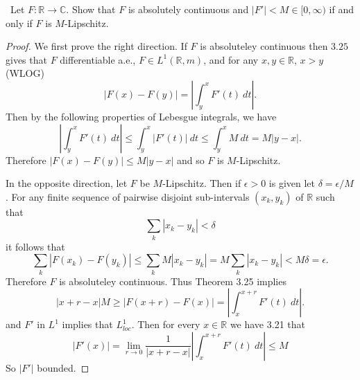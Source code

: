 \documentclass[11pt]{amsart}
\theoremstyle{definition}
\numberwithin{theorem}{section}
\numberwithin{definition}{section}
\numberwithin{equation}{section}
\begin{document}
  \medskip {}\ Let $F: \mathbb{R} \to \mathbb{C}$. Show that $F$ is absolutely continuous and $|F'| < M \in [0, \infty)$
  if and only if $F$ is $M$-Lipschitz.
  \begin{proof}
  	We first prove the right direction. If $F$ is absoluteley continuous then $3.25$ gives  that $F$ differentiable a.e., $F \in L^1(\mathbb{R}, m)$, and for any $x,y \in \mathbb{R}$, $x >y$ (WLOG)
  	\begin{equation*}
  		|F(x) - F(y)| = \left|\int_y^x F'(t)\ dt\right|.
  	\end{equation*}
  	Then  by the following properties of Lebesgue integrals, we have
  	\begin{equation*}
  		\left|\int_y^x F'(t)\ dt\right| \leq \int_y^x |F'(t)|\ dt \leq \int_y^x M\ dt = M|y-x|
  		.
  	\end{equation*}
  	Therefore $|F(x) - F(y)|  \leq M|y-x|$ and so $F$ is $M$-Lipschitz.

  	In the opposite direction, let $F$ be $M$-Lipschitz. Then if $\epsilon > 0$ is given let $\delta = \epsilon/M$. For any finite sequence of pairwise disjoint sub-intervals $(x_k, y_k)$ of $\mathbb{R}$ such that
  	\begin{equation*}
 		\sum_k |x_k - y_k| < \delta 	
  	\end{equation*}
  	it follows that 
  	\begin{equation*}
  		\sum_{k} |F(x_k) - F(y_k)| \leq \sum_k M|x_k -y_k| = M\sum_k |x_k -y_k| < M\delta = \epsilon.
  	\end{equation*}
  	Therefore $F$ is absoluteley continuous. Thus Theorem 3.25 implies
  	\begin{equation*}
  	 	|x+r - x|M \geq |F(x+r) - F(x)| = \left|\int_x^{x+r} F'(t)\ dt\right|.
  	 \end{equation*}
  	 and $F'$ in $L^1$ implies that $L^1_{loc}$. Then for every $x \in \mathbb{R}$ we have 3.21
  	 that
 	\begin{equation*}
		|F'(x)| =\lim_{r \to 0} \frac{1}{|x+r -x|} \left|\int_x^{x+r} F'(t)\ dt\right| \leq M
 	\end{equation*}
 	So $|F'|$ bounded.
  \end{proof}
\end{document}
